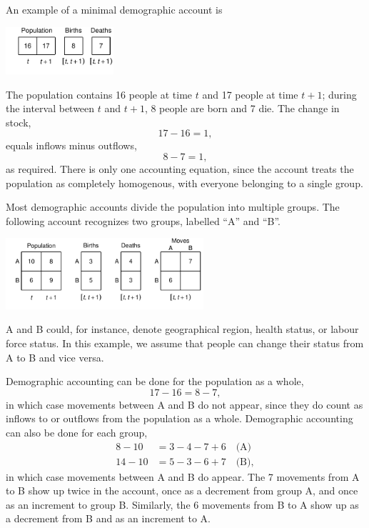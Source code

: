 \documentclass[USenglish]{article}
\begin{document}
An example of a minimal demographic account is
\begin{center}
\includegraphics[width=0.3\textwidth]{figures_accounts/fig_account_noage.pdf}
\end{center}
The population contains 16 people at time $t$ and 17 people at time $t+1$; during the interval between $t$ and $t+1$, 8 people are born and 7 die. The change in stock,
\begin{equation*}
  17 - 16 = 1,
\end{equation*}
equals inflows minus outflows,
\begin{equation*}
   8 - 7 = 1,
\end{equation*}
as required. There is only one accounting equation, since the account treats the population as completely homogenous, with everyone belonging to a single group.

Most demographic accounts divide the population into multiple groups. The following account recognizes two groups, labelled ``A'' and ``B''. 
\begin{center}
\includegraphics[width=0.55\textwidth]{figures_accounts/fig_account_region.pdf}
\end{center}
A and B could, for instance, denote geographical region, health status, or labour force status. In this example, we assume that people can change their status from A to B and vice versa.

Demographic accounting can be done for the population as a whole,
\begin{equation*}
    17 - 16 = 8 - 7,
\end{equation*}
in which case movements between A and B do not appear, since they do count as inflows to or outflows from the population as a whole. Demographic accounting can also be done for each group,
\begin{align*}
    8 - 10 & = 3 - 4 - 7 + 6 \quad \text{(A)}\\
    14 - 10 & = 5 - 3 - 6 + 7 \quad \text{(B)},
\end{align*}
in which case movements between A and B do appear. The 7 movements from A to B show up twice in the account, once as a decrement from group A, and once as an increment to group B. Similarly, the 6 movements from B to A show up as a decrement from B and as an increment to A.
\end{document}
